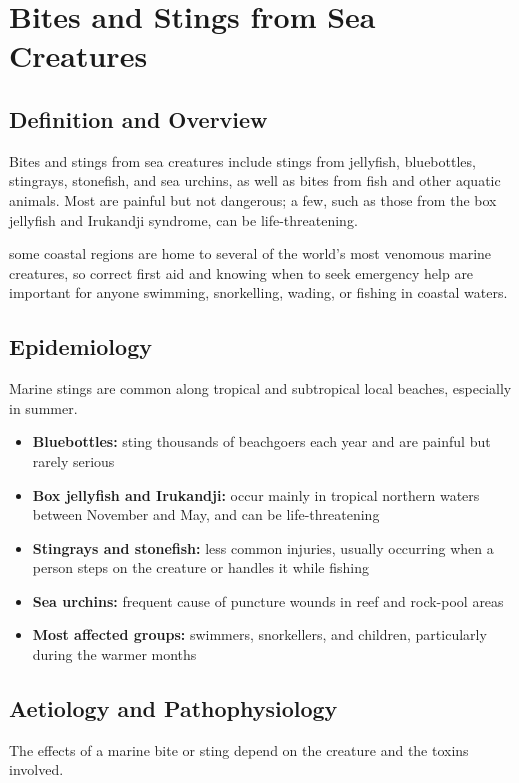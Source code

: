 \chapter{Bites and Stings from Sea Creatures}

\section*{Definition and Overview}
Bites and stings from sea creatures include stings from jellyfish, bluebottles, stingrays, stonefish, and sea urchins, as well as bites from fish and other aquatic animals. Most are painful but not dangerous; a few, such as those from the box jellyfish and Irukandji syndrome, can be life-threatening.

some coastal regions are home to several of the world's most venomous marine creatures, so correct first aid and knowing when to seek emergency help are important for anyone swimming, snorkelling, wading, or fishing in coastal waters.

\section*{Epidemiology}
Marine stings are common along tropical and subtropical local beaches, especially in summer.

\begin{itemize}
    \item \textbf{Bluebottles:} sting thousands of beachgoers each year and are painful but rarely serious
    \item \textbf{Box jellyfish and Irukandji:} occur mainly in tropical northern waters between November and May, and can be life-threatening
    \item \textbf{Stingrays and stonefish:} less common injuries, usually occurring when a person steps on the creature or handles it while fishing
    \item \textbf{Sea urchins:} frequent cause of puncture wounds in reef and rock-pool areas
    \item \textbf{Most affected groups:} swimmers, snorkellers, and children, particularly during the warmer months
\end{itemize}

\section*{Aetiology and Pathophysiology}
The effects of a marine bite or sting depend on the creature and the toxins involved.

